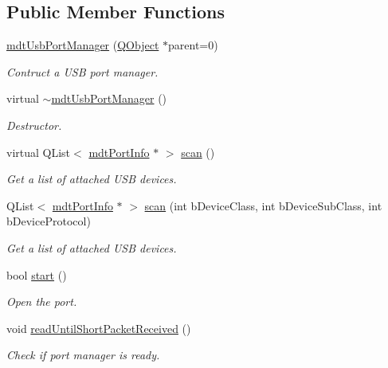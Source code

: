 \subsection*{Public Member Functions}
\begin{DoxyCompactItemize}
\item 
\hyperlink{classmdt_usb_port_manager_a7f82574e84d0a99d1c8bef7fd79283e3}{mdt\-Usb\-Port\-Manager} (\hyperlink{class_q_object}{Q\-Object} $\ast$parent=0)
\begin{DoxyCompactList}\small\item\em Contruct a U\-S\-B port manager. \end{DoxyCompactList}\item 
virtual \hyperlink{classmdt_usb_port_manager_ac0da1cf62e664b78fe91b873da5835ce}{$\sim$mdt\-Usb\-Port\-Manager} ()
\begin{DoxyCompactList}\small\item\em Destructor. \end{DoxyCompactList}\item 
virtual Q\-List$<$ \hyperlink{classmdt_port_info}{mdt\-Port\-Info} $\ast$ $>$ \hyperlink{classmdt_usb_port_manager_a3a2370c3a2d0353a880bf9b777728c3b}{scan} ()
\begin{DoxyCompactList}\small\item\em Get a list of attached U\-S\-B devices. \end{DoxyCompactList}\item 
Q\-List$<$ \hyperlink{classmdt_port_info}{mdt\-Port\-Info} $\ast$ $>$ \hyperlink{classmdt_usb_port_manager_ab28253c46c80bb12cbbd116b05c4bcd3}{scan} (int b\-Device\-Class, int b\-Device\-Sub\-Class, int b\-Device\-Protocol)
\begin{DoxyCompactList}\small\item\em Get a list of attached U\-S\-B devices. \end{DoxyCompactList}\item 
bool \hyperlink{classmdt_usb_port_manager_ac656805c6de08c9c6a2487291cf3f347}{start} ()
\begin{DoxyCompactList}\small\item\em Open the port. \end{DoxyCompactList}\item 
void \hyperlink{classmdt_usb_port_manager_adff8a1f8ed2b0e68229e2016c75e04a6}{read\-Until\-Short\-Packet\-Received} ()
\begin{DoxyCompactList}\small\item\em Check if port manager is ready. \end{DoxyCompactList}\item 

\end{DoxyCompactItemize}
